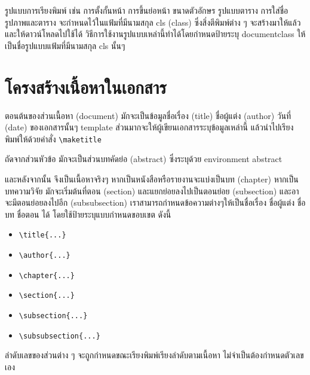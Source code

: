 รูปแบบการเรียงพิมพ์ เช่น การตั้งกั้นหน้า การขึ้นย่อหน้า ขนาดตัวอักษร รูปแบบตาราง การใส่ชื่อรูปภาพและตาราง จะกำหนดไว้ในแฟ้มที่มีนามสกุล cls (class) ซึ่งสิ่งตีพิมพ์ต่าง ๆ จะสร้างมาให้แล้วและให้ดาวน์โหลดไปใช้ได้
วิธีการใช้งานรูปแบบเหล่านี้ทำได้โดยกำหนดป้ายระบุ documentclass ให้เป็นชื่อรูปแบบแฟ้มที่มีนามสกุล cls นั้นๆ


\section{โครงสร้างเนื้อหาในเอกสาร}
ตอนต้นของส่วนเนื้อหา (document) มักจะเป็นข้อมูลชื่อเรื่อง (title) ชื่อผู้แต่ง (author) วันที่ (date) ของเอกสารนั้นๆ template ส่วนมากจะให้ผู้เขียนเอกสารระบุข้อมูลเหล่านี้ แล้วนำไปเรียงพิมพ์ให้ด้วยคำสั่ง \lstinline|\maketitle|

ถัดจากส่วนหัวข้อ มักจะเป็นส่วนบทคัดย่อ (abstract) ซึ่งระบุด้วย environment abstract

และหลังจากนั้น จึงเป็นเนื้อหาจริงๆ หากเป็นหนังสือหรือรายงานจะแบ่งเป็นบท (chapter) หากเป็นบทความวิจัย มักจะเริ่มต้นที่ตอน (section) และแยกย่อยลงไปเป็นตอนย่อย (subsection) และอาจะมีตอนย่อยลงไปอีก (subsubsection)
เราสามารถกำหนดข้อความต่างๆให้เป็นชื่อเรื่อง ชื่อผู้แต่ง ชื่อบท ชื่อตอน ได้ โดยใช้ป้ายระบุแบบกำหนดขอบเขต ดังนี้

\begin{multicols}{2}
	\begin{itemize}
		\item \lstinline|\title{...}| 
		\item \lstinline|\author{...}| 
		\item \lstinline|\chapter{...}| 
		\item \lstinline|\section{...}| 
		\item \lstinline|\subsection{...}| 
		\item \lstinline|\subsubsection{...}| 
	\end{itemize}
\end{multicols}
ลำดับเลขของส่วนต่าง ๆ จะถูกกำหนดขณะเรียงพิมพ์เรียงลำดับตามเนื้อหา ไม่จำเป็นต้องกำหนดตัวเลขเอง

